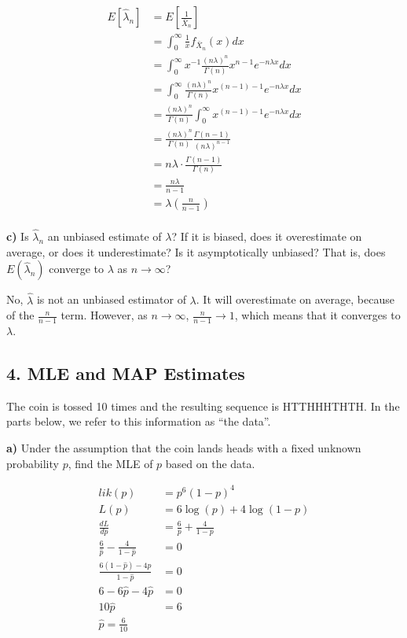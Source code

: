 \documentclass[11pt]{article}
\begin{document}
\begin{align*}
	E[\hat \lambda_{n}] &= E[\frac{1}{\bar X_{n}}]\\
	&= \int_{0}^{\infty } \frac{1}{x} f_{\bar X_{n}}(x) dx \\
	&= \int_{0}^{\infty } x^{-1} \frac{(n\lambda)^{n}}{\Gamma(n)} x^{n-1}e^{-n\lambda x}dx \\
	&= \int_{0}^{\infty } \frac{(n\lambda)^{n}}{\Gamma(n)} x^{(n-1) - 1}e^{-n\lambda x}dx \\
	&= \frac{(n\lambda)^{n}}{\Gamma(n)} \int_{0}^{\infty } x^{(n-1) -1}e^{-n\lambda x}dx \\
	&= \frac{(n\lambda)^{n}}{\Gamma(n)} \frac{\Gamma(n-1)}{(n\lambda)^{n-1}} \\
	&= n\lambda \cdot \frac{\Gamma(n-1)}{\Gamma(n)} \\
	&= \frac{n\lambda}{n-1} \\
	&= \lambda \left(\frac{n}{n-1}\right) \\
\end{align*}




\textbf{c)} Is \(\hat{\lambda}_n\) an unbiased estimate of \(\lambda\)?
If it is biased, does it overestimate on average, or does it
underestimate? Is it asymptotically unbiased? That is, does
\(E(\hat{\lambda}_n)\) converge to \(\lambda\) as \(n \to \infty\)?

No, $\hat \lambda$ is not an unbiased estimator of $\lambda$. It will overestimate on average, because of the $\frac{n}{n-1}$ term. However, as $n\to \infty $, $\frac{n}{n-1} \to 1$, which means that it converges to $\lambda$. 
    \newpage

    \hypertarget{mle-and-map-estimates}{%
\subsection{4. MLE and MAP Estimates}\label{mle-and-map-estimates}}

The coin is tossed 10 times and the resulting sequence is HTTHHHTHTH. In
the parts below, we refer to this information as ``the data''.

\textbf{a)} Under the assumption that the coin lands heads with a fixed
unknown probability \(p\), find the MLE of \(p\) based on the data.


\begin{align*}
	lik(p) &= p^{6}(1-p)^{4} \\ 
	L(p) &= 6\log(p) + 4\log(1-p)\\
	\frac{dL}{dp} &= \frac{6}{p} + \frac{4}{1-p} \\
	\frac{6}{\hat p} - \frac{4}{1 - \hat p} &= 0 \\
	\frac{6(1-\hat p) - 4p}{1-\hat p } &= 0 \\
	6 - 6\hat p - 4 \hat p  &= 0 \\
	10\hat p &= 6 \\
\hat p = \frac{6}{10} 
\end{align*}
\end{document}
